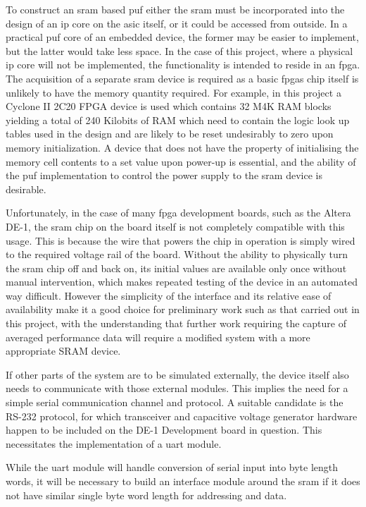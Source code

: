 To construct an \gls{sram} based \gls{puf} either the \gls{sram} must be
incorporated into the design of an \gls{ip} core on the \gls{asic} itself,
or it could be accessed from outside.
In a practical \gls{puf} core of an embedded device, the former may be easier
to implement, but the latter would take less space.
In the case of this project, where a physical \gls{ip} core will not be
implemented, the functionality is intended to reside in an \gls{fpga}.
The acquisition of a separate \gls{sram} device is required as a basic
\glspl{fpga} chip itself is unlikely to have the memory quantity required.
For example, in this project a Cyclone II 2C20 FPGA device is used which contains
32 M4K RAM blocks yielding a total of 240 Kilobits of RAM which need to contain
the logic look up tables used in the design and are likely to be reset undesirably
to zero upon memory initialization.
A device that does not have the property of initialising the memory cell
contents to a set value upon power-up is essential, and the
ability of the \gls{puf} implementation to control the power supply to the
\gls{sram} device is desirable.

Unfortunately, in the case of many \gls{fpga} development boards, such as the
Altera DE-1\cite{altera2006usermanual}, the \gls{sram} chip on the board itself
is not completely compatible with this usage.
This is because the wire that powers the chip in operation is simply wired to
the required voltage rail of the board.
Without the ability to physically turn the \gls{sram} chip off and back on,
its initial values are available only once without manual intervention, which makes
repeated testing of the device in an automated way difficult.
However the simplicity of the
interface and its relative ease of availability make it a good choice for preliminary work
such as that carried out in this project, with the understanding that further work
requiring the capture of averaged performance data will require a modified system with
a more appropriate SRAM device.

If other parts of the system are to be simulated externally, the device itself
also needs to communicate with those external modules. This implies the need for a
simple serial communication channel and protocol. A suitable candidate is the RS-232
protocol, for which transceiver and capacitive voltage generator hardware happen
to be included on the DE-1 Development board in question. This necessitates the
implementation of a \gls{uart} module.

While the \gls{uart} module will handle conversion of serial input into byte length words,
it will be necessary to build an interface module around the \gls{sram} if it does not have similar
single byte word length for addressing and data.

